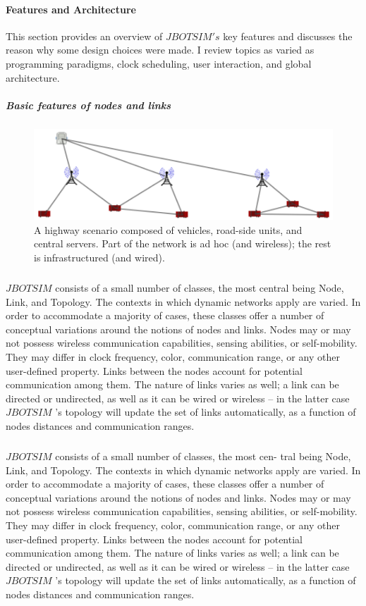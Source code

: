 \paragraph{Features and Architecture}This section provides an overview of $JBOTSIM's$ key features and discusses the reason why some design choices were made. I review topics as varied as programming paradigms, clock scheduling, user interaction, and global architecture.
\newpage
\subparagraph{Basic features of nodes and links} 
\begin{figure}[h!]
	\centering
	\includegraphics[width=0.7\linewidth]{fig_2}
	\caption[A highway scenario composed of vehicles, road-side units, and central servers. Part of the network is ad hoc (and wireless); the rest is infrastructured (and wired).]{A highway scenario composed of vehicles, road-side units, and central servers. Part of the network is ad hoc (and wireless); the rest is infrastructured (and wired).}
	\label{fig:fig2}
\end{figure}
\subparagraph{} $JBOTSIM$ consists of a small number of classes, the most central being Node, Link, and Topology. The contexts in which dynamic networks apply are varied. In order to accommodate a majority of cases, these classes offer a number of conceptual variations around the notions of nodes and links. Nodes may or may not possess wireless communication capabilities, sensing abilities, or self-mobility. They may differ in clock frequency, color, communication range, or any other user-defined property. Links between the nodes account for potential communication among them. The nature of links varies as well; a link can be directed or undirected, as well as it can be wired or wireless – in the latter case  $JBOTSIM$ ’s topology will update the set of links automatically, as a function of nodes distances and communication ranges.
\subparagraph{} $JBOTSIM$  consists of a small number of classes, the most cen- tral being Node, Link, and Topology. The contexts in which dynamic networks apply are varied. In order to accommodate a majority of cases, these classes offer a number of conceptual variations around the notions of nodes and links. Nodes may or may not possess wireless communication capabilities, sensing abilities, or self-mobility. They may differ in clock frequency, color, communication range, or any other user-defined property. Links between the nodes account for potential communication among them. The nature of links varies as well; a link can be directed or undirected, as well as it can be wired or wireless – in the latter case  $JBOTSIM$ ’s topology will update the set of links automatically, as a function of nodes distances and communication ranges.
